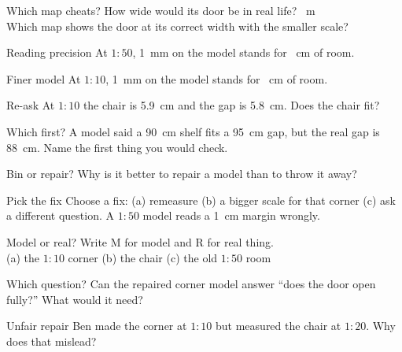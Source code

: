 Which map cheats? \wline[1.6cm] How wide would its door be in real life? \wline[1.6cm]~m\\[8pt]
Which map shows the door at its correct width with the smaller scale? \wline[1.6cm]

\clearpage

\begin{puzzle}{Reading precision}
At $1:50$, 1~mm on the model stands for \wline[1.6cm]~cm of room.
\end{puzzle}

\begin{puzzle}{Finer model}
At $1:10$, 1~mm on the model stands for \wline[1.6cm]~cm of room.
\end{puzzle}

\begin{puzzle}{Re-ask}
At $1:10$ the chair is 5.9~cm and the gap is 5.8~cm. Does the chair fit? \wline[2cm]
\end{puzzle}

\begin{puzzle}{Which first?}
A model said a 90~cm shelf fits a 95~cm gap, but the real gap is 88~cm. Name the first thing you would check. \wline[6cm]
\end{puzzle}

\begin{puzzle}{Bin or repair?}
Why is it better to repair a model than to throw it away? \wline[6cm]
\end{puzzle}

\clearpage

\begin{puzzle}{Pick the fix}
Choose a fix: (a) remeasure (b) a bigger scale for that corner (c) ask a different question. A $1:50$ model reads a 1~cm margin wrongly. \wline[1.6cm]
\end{puzzle}

\begin{puzzle}{Model or real?}
Write M for model and R for real thing.\\
(a) the $1:10$ corner \wline[1cm] \quad (b) the chair \wline[1cm] \quad (c) the old $1:50$ room \wline[1cm]
\end{puzzle}

\begin{puzzle}{Which question?}
Can the repaired corner model answer ``does the door open fully?'' \wline[2cm] What would it need? \wline[4cm]
\end{puzzle}

\begin{puzzle}{Unfair repair}
Ben made the corner at $1:10$ but measured the chair at $1:20$. Why does that mislead? \wline[6cm]
\end{puzzle}

